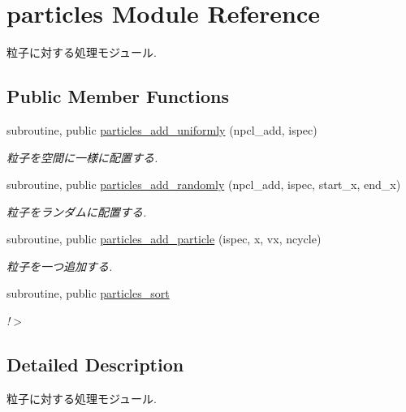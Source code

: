 \hypertarget{classparticles}{\section{particles Module Reference}
\label{classparticles}
}


粒子に対する処理モジュール.  


\subsection*{Public Member Functions}
\begin{DoxyCompactItemize}
\item 
subroutine, public \hyperlink{classparticles_a301ecb6ddf22c9bfc9798ac61b70b495}{particles\-\_\-add\-\_\-uniformly} (npcl\-\_\-add, ispec)
\begin{DoxyCompactList}\small\item\em 粒子を空間に一様に配置する. \end{DoxyCompactList}\item 
subroutine, public \hyperlink{classparticles_a03ec3148c087f908d59a9b649ec39a39}{particles\-\_\-add\-\_\-randomly} (npcl\-\_\-add, ispec, start\-\_\-x, end\-\_\-x)
\begin{DoxyCompactList}\small\item\em 粒子をランダムに配置する. \end{DoxyCompactList}\item 
subroutine, public \hyperlink{classparticles_a0a33a04526965e35b16a96f690f7cc99}{particles\-\_\-add\-\_\-particle} (ispec, x, vx, ncycle)
\begin{DoxyCompactList}\small\item\em 粒子を一つ追加する. \end{DoxyCompactList}\item 
subroutine, public \hyperlink{classparticles_aaad2868395b8383d8fa2740c290cd4aa}{particles\-\_\-sort}
\begin{DoxyCompactList}\small\item\em !$>$ \end{DoxyCompactList}\end{DoxyCompactItemize}


\subsection{Detailed Description}
粒子に対する処理モジュール. 

